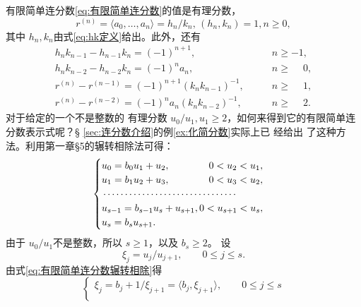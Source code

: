 \begin{theorem}
	有限简单连分数\eqref{eq:有限简单连分数}的值是有理分数，
	\begin{equation}
		r^{(n)} = \langle a_0, \dots, a_n \rangle = h_n/k_n,\, \left(h_n, k_n\right) = 1, n \geqslant 0,
	\end{equation}
	其中 \( h_n, k_n \)由式\eqref{eq:hk定义}给出。此外，还有
	\begin{align}
		h_nk_{n-1} - h_{n-1}k_n = (-1)^{n+1}, \qquad               & n \geqslant -1,           \\
		h_nk_{n-2} - h_{n-2}k_n = (-1)^{n}a_n, \qquad              & n \geqslant \phantom{-}0, \\
		r^{(n)} - r^{(n-1)} = (-1)^{n+1}(k_nk_{n-1})^{-1}, \qquad  & n \geqslant \phantom{-}1,
		\label{eq:有限简单连分数误差1}                                                         \\
		r^{(n)} - r^{(n-2)} = (-1)^{n}a_n(k_nk_{n-2})^{-1}, \qquad & n \geqslant \phantom{-}2.
		\label{eq:有限简单连分数误差2}
	\end{align}
	对于给定的一个不是整数的 有理分数 \( u_0 / u_1, u_1 \geqslant 2 \)，如何来得到它的有限简单连分数表示式呢？\S
	\ref{sec:连分数介绍}的例\ref{ex:化简分数}实际上已 经给出 了这种方法。利用第一章§5的辗转相除法可得：
	\begin{equation}\label{eq:有限简单连分数辗转相除}
		\begin{cases}
			u_0 = b_0 u_1 + u_2, \hfill              0 < u_2 < u_1,     \\
			u_1 = b_1 u_2 + u_3, \hfill              0 < u_3 < u_2,     \\
			\begin{minipage}{0.4\textwidth}
				\dotfill
			\end{minipage}                              \\
			u_{s-1} = b_{s-1} u_s + u_{s+1}, \hfill  0 < u_{s+1} < u_s, \\
			u_s = b_s u_{s+1}. \hfill
		\end{cases}
	\end{equation}
	由于 \( u_0 / u_1 \)不是整数，所以 \( s \geqslant 1 \)，以及 \( b_s \geqslant 2 \)。 设
	\begin{equation}
		\xi_j = u_j / u_{j+1}, \qquad 0 \leqslant j \leqslant s.
	\end{equation}
	由式\eqref{eq:有限简单连分数辗转相除}得
	\begin{equation}
		\begin{cases}
			\xi_j = b_j + 1 / \xi_{j + 1} = \langle b_j, \xi_{j+1} \rangle, \qquad 0 \leqslant j \leqslant s \\

\end{cases}
\end{equation}
\end{theorem}
